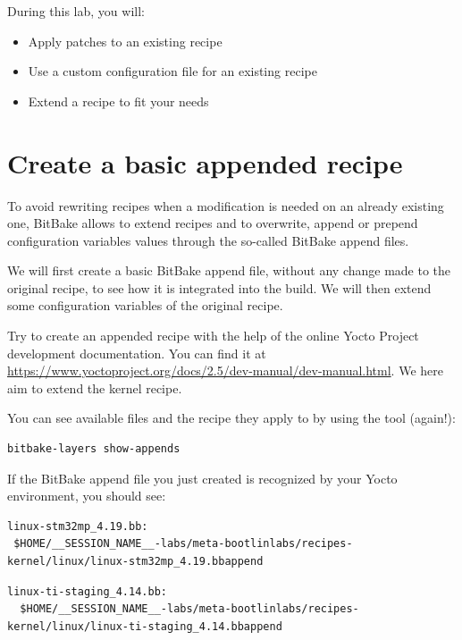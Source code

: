 
During this lab, you will:
\begin{itemize}
  \item Apply patches to an existing recipe
  \item Use a custom configuration file for an existing recipe
  \item Extend a recipe to fit your needs
\end{itemize}

\section{Create a basic appended recipe}

To avoid rewriting recipes when a modification is needed on an already existing
one, BitBake allows to extend recipes and to overwrite, append or prepend
configuration variables values through the so-called BitBake append files.

We will first create a basic BitBake append file, without any change made
to the original recipe, to see how it is integrated into the build. We will then
extend some configuration variables of the original recipe.

Try to create an appended recipe with the help of the online Yocto
Project development documentation. You can find it at
\url{https://www.yoctoproject.org/docs/2.5/dev-manual/dev-manual.html}. We here
aim to extend the 
{} kernel recipe.

You can see available  files and the recipe they apply to by
using the  tool (again!):
\begin{verbatim}
bitbake-layers show-appends
\end{verbatim}

If the BitBake append file you just created is recognized by your Yocto
environment, you should see:
\if{}
\begin{verbatim}
linux-stm32mp_4.19.bb:
 $HOME/__SESSION_NAME__-labs/meta-bootlinlabs/recipes-kernel/linux/linux-stm32mp_4.19.bbappend
\end{verbatim}
\else
\begin{verbatim}
linux-ti-staging_4.14.bb:
  $HOME/__SESSION_NAME__-labs/meta-bootlinlabs/recipes-kernel/linux/linux-ti-staging_4.14.bbappend
\end{verbatim}
\fi

